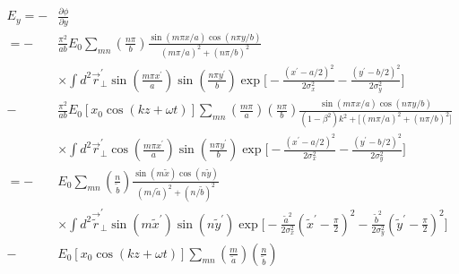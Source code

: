 \documentclass[11pt,oneside]{article}
\begin{document}
\begin{equation}
\begin{split}
  E_{y} = - & \frac{ \partial \phi }{ \partial y } \\
=
- & \frac{\pi^{2}}{ab} E_{0}
    \sum_{mn} \left( \frac{n \pi}{b} \right)
    \frac{ \sin \left( m \pi x /a \right) \cos \left( n \pi y /b \right) }
         { \left( m \pi /a \right)^{2} + \left( n \pi /b \right)^{2} } \\
  & \times
    \int d^{2} \vec{r}_{\perp}^{\prime}
    \sin \left( \frac{ m \pi x^{\prime} }{ a } \right)
    \sin \left( \frac{ n \pi y^{\prime} }{ b } \right)
    \exp \Bigg[
       - \frac{ \left( x^{\prime} - a/2 \right)^{2} }{ 2\sigma_{x}^{2}}
       - \frac{ \left( y^{\prime} - b/2 \right)^{2} }{ 2\sigma_{y}^{2}}
         \Bigg] \\
- & \frac{\pi^{2}}{ab} E_{0}
    \left[ x_{0} \cos( k z+\omega t) \right] 
    \sum_{mn} 
    \left( \frac{m \pi}{a} \right)  \left( \frac{n \pi}{b} \right)
    \frac{ \sin \left( m \pi x /a \right) \cos \left( n \pi y /b \right) }
         { \left( 1 - \beta^{2} \right) k^{2}
         + \Big[
           \left( m \pi /a \right)^{2} + \left( n \pi /b \right)^{2}
           \Big] } \\
  & \times
    \int d^{2} \vec{r}_{\perp}^{\prime}
    \cos \left( \frac{ m \pi x^{\prime} }{ a } \right)
    \sin \left( \frac{ n \pi y^{\prime} }{ b } \right)
    \exp \Bigg[
       - \frac{ \left( x^{\prime} - a/2 \right)^{2} }{ 2\sigma_{x}^{2}}
       - \frac{ \left( y^{\prime} - b/2 \right)^{2} }{ 2\sigma_{y}^{2}}
         \Bigg] \\
=
- & E_{0}
    \sum_{mn} \left( \frac{n}{\tilde{b}} \right)
    \frac{ \sin \left( m \tilde{x} \right) \cos \left( n \tilde{y} \right) }
         { \left( m / \tilde{a} \right)^{2} + 
           \left( n / \tilde{b} \right)^{2} } \\
  & \times
    \int d^{2} \vec{\tilde{r}}_{\perp}^{\prime}
    \sin \left( m \tilde{x}^{\prime} \right)
    \sin \left( n \tilde{y}^{\prime} \right)
    \exp \Bigg[
       - \frac{ \tilde{a}^{2} } { 2\sigma_{x}^{2}}
         \left( \tilde{x}^{\prime} - \frac{\pi}{2} \right)^{2}
       - \frac{ \tilde{b}^{2} } { 2\sigma_{y}^{2}}
         \left( \tilde{y}^{\prime} - \frac{\pi}{2} \right)^{2}
         \Bigg] \\
- & E_{0}
    \left[ x_{0} \cos( k z+\omega t) \right]
    \sum_{mn} 
    \left( \frac{m}{\tilde{a}} \right) \left( \frac{n}{\tilde{b}} \right)

\end{split}
\end{equation}
\end{document}
